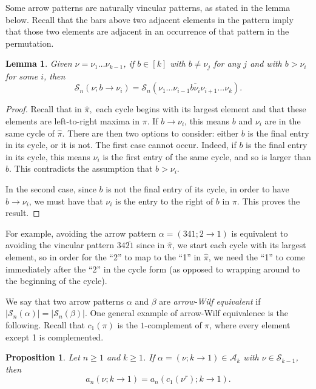 \documentclass[11pt]{article}
\renewcommand\S{\mathcal S}
\newcommand\A{\mathcal A}
\newtheorem{lemma}[theorem]{Lemma}
\newtheorem{proposition}[theorem]{Proposition}
\theoremstyle{definition}
\begin{document}
Some arrow patterns are naturally vincular patterns, as stated in the lemma below. Recall that the bars above two adjacent elements in the pattern imply that those two elements are adjacent in an occurrence of that pattern in the permutation. 

\begin{lemma} \label{lem: vincArrow}
    Given $\nu=\nu_1\ldots \nu_{k-1}$, if $b\in [k]$ with $b\neq \nu_j$ for any $j$ and with $b > \nu_i$ for some $i$, then \[\S_n(\nu ; b \to \nu_i) = \S_n(\nu_1\ldots \nu_{i-1}\overline{b \nu_i} \nu_{i+1}\ldots \nu_k).\]
\end{lemma}

\begin{proof}
    Recall that in $\hat\pi,$ each cycle begins with its largest element and that these elements are left-to-right maxima in $\pi.$ If $b \to \nu_i$, this means $b$ and $\nu_i$ are in the same cycle of $\hat\pi$. There are then two options to consider: either $b$ is the final entry in its cycle, or it is not. The first case cannot occur. Indeed, if $b$ is the final entry in its cycle, this means $\nu_i$ is the first entry of the same cycle, and so is larger than $b$. This contradicts the assumption that $b > \nu_i$.

    In the second case, since $b$ is not the final entry of its cycle, in order to have $b \to \nu_i$, we must have that $\nu_i$ is the entry to the right of $b$ in $\pi$. This proves the result.
\end{proof}

For example, avoiding the arrow pattern $\alpha=(341; 2\to 1)$ is equivalent to avoiding the vincular pattern $34\overline{21}$ since in $\hat\pi$, we start each cycle with its largest element, so in order for the ``2'' to map to the ``1'' in $\hat\pi$, we need the ``1'' to come immediately after the ``2'' in the cycle form (as opposed to wrapping around to the beginning of the cycle).


We say that two arrow patterns $\alpha$ and $\beta$ are \emph{arrow-Wilf equivalent} if $|\S_n(\alpha)| = |\S_n(\beta)|$. One general example of arrow-Wilf equivalence is the following. Recall that $c_1(\pi)$ is the $1$-complement of $\pi$, where every element except 1 is complemented.

\begin{proposition} \label{prop: rc1}
    Let $n\geq 1$ and $k\geq 1$. If $\alpha =(\nu; k\to 1)\in\A_k$ with $\nu\in\S_{k-1}$, then
    \[a_n(\nu;k\to 1) = a_n(c_1(\nu^r); k\to 1).\]
\end{proposition}
\end{document}
